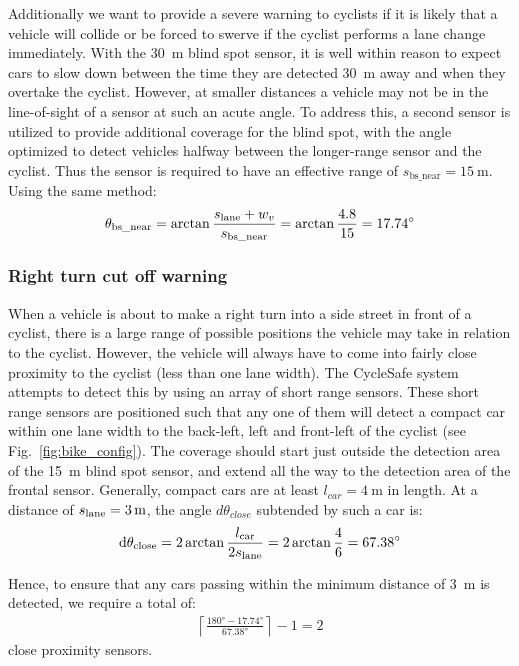 \documentclass[journal]{IEEEtran}
\begin{document}
Additionally we want to provide a severe warning to cyclists if it is likely that a vehicle will collide or be forced to swerve if the cyclist performs a lane change immediately. With the \SI{30}{\meter} blind spot sensor, it is well within reason to expect cars to slow down between the time they are detected \SI{30}{\meter} away and when they overtake the cyclist. However, at smaller distances a vehicle may not be in the line-of-sight of a sensor at such an acute angle. To address this, a second sensor is utilized to provide additional coverage for the blind spot, with the angle optimized to detect vehicles halfway between the longer-range sensor and the cyclist. Thus the sensor is required to have an effective range of $s_\text{bs\_near} = \SI{15}{\meter}$. Using the same method:
\begin{equation}
\theta_\text{bs\_near} 
    = \arctan{\frac{s_\text{lane}+ w_v}{s_\text{bs\_near}}} 
    = \arctan{\frac{4.8}{15}} 
    = \ang{17.74}
\end{equation}

\subsubsection{Right turn cut off warning}
\label{sys:cutoff}
When a vehicle is about to make a right turn into a side street in front of a cyclist, there is a large range of possible positions the vehicle may take in relation to the cyclist. However, the vehicle will always have to come into fairly close proximity to the cyclist (less than one lane width). The CycleSafe system attempts to detect this by using an array of short range sensors. These short range sensors are positioned such that any one of them will detect a compact car within one lane width to the back-left, left and front-left of the cyclist (see Fig.~\ref{fig:bike_config}). The coverage should start just outside the detection area of the \SI{15}{\meter} blind spot sensor, and extend all the way to the detection area of the frontal sensor. Generally, compact cars are at least $l_{car} = \SI{4}{\meter}$ in length. At a distance of $s_\text{lane} = \SI{3}{\meter}$, the angle $d\theta_{close}$ subtended by such a car is:
\begin{equation}
\dd{\theta_\text{close}} 
    = 2\arctan{\frac{l_\text{car}}{2s_\text{lane}}} 
    = 2\arctan{\frac{4}{6}} 
    = \ang{67.38}
\end{equation}

Hence, to ensure that any cars passing within the minimum distance of \SI{3}{\meter} is detected, we require a total of:
\begin{align}
    \left\lceil \frac{ \ang{180} - \ang{17.74} }{ \ang{67.38} } \right\rceil - 1 = 2
\end{align}
close proximity sensors.
\end{document}
